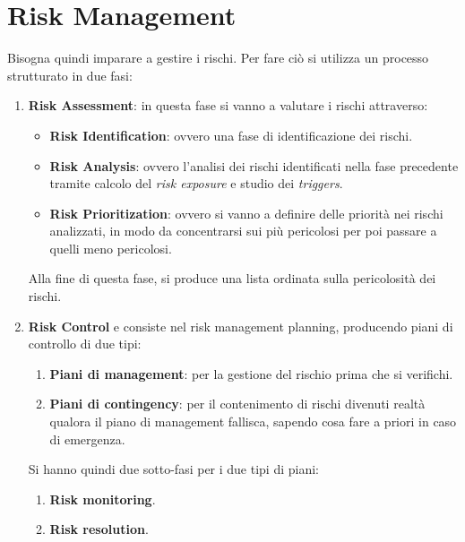 \section{Risk Management}
Bisogna quindi imparare a gestire i rischi. Per fare ciò si utilizza un processo
strutturato in due fasi:
\begin{enumerate}
    \item \textbf{Risk Assessment}: in questa fase si vanno a valutare i rischi
          attraverso:
          \begin{itemize}
              \item \textbf{Risk Identification}: ovvero una fase di identificazione
                    dei rischi.
              \item \textbf{Risk Analysis}: ovvero l'analisi dei rischi identificati
                    nella fase precedente tramite calcolo del \textit{risk exposure} e
                    studio dei \textit{triggers}.
              \item \textbf{Risk Prioritization}: ovvero si vanno a definire delle
                    priorità nei rischi analizzati, in modo da concentrarsi sui più
                    pericolosi per poi passare a quelli meno pericolosi.
          \end{itemize}

          Alla fine di questa fase, si produce una lista ordinata sulla pericolosità
          dei rischi.
    \item \textbf{Risk Control} e consiste nel risk management planning, producendo
          piani di controllo di due tipi:
          \begin{enumerate}
              \item \textbf{Piani di management}: per la gestione del rischio prima che
                    si verifichi.
              \item \textbf{Piani di contingency}: per il contenimento di rischi divenuti
                    realtà qualora il piano di management fallisca, sapendo cosa fare a priori
                    in caso di emergenza.
          \end{enumerate}

          Si hanno quindi due sotto-fasi per i due tipi di piani:
          \begin{enumerate}
              \item \textbf{Risk monitoring}.
              \item \textbf{Risk resolution}.
          \end{enumerate}
\end{enumerate}

